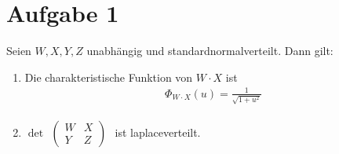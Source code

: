 \documentclass[12pt,a4paper]{article}
\author{Willi Sontopski}
\begin{document}
\section*{Aufgabe 1}
Seien $W,X,Y,Z$ unabhängig und standardnormalverteilt. Dann gilt:
\begin{enumerate}[label=\alph*)]
	\item Die charakteristische Funktion von $W\cdot X$ ist 
	\begin{align*}
		\Phi_{W\cdot X}(u)=\frac{1}{\sqrt{1+u^2}}
	\end{align*}
	\item $\det\begin{aligned}
		\begin{pmatrix}
			W & X\\
			Y & Z
		\end{pmatrix}
	\end{aligned}$ ist laplaceverteilt.
\end{enumerate}
\end{document}
